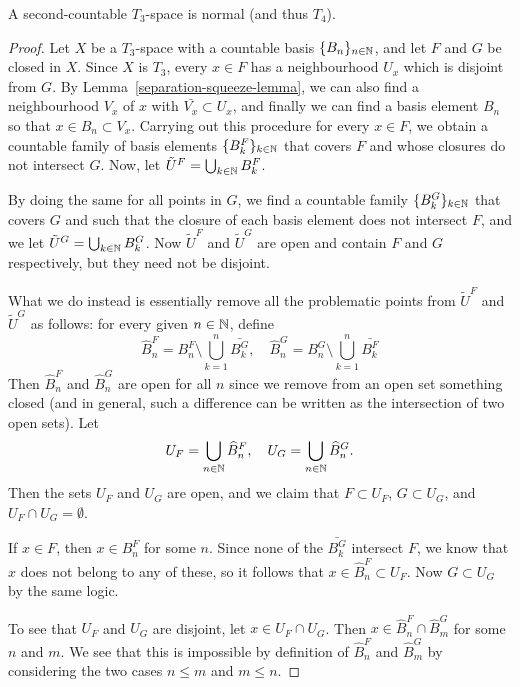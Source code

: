 \begin{thm}
  A second-countable $T_3$-space is normal (and thus $T_4$).
\end{thm}
\begin{proof}
  Let $X$ be a $T_3$-space with a countable basis $\{B_n\}_{n \in \mathbb{N}}$, and let $F$ and $G$ be closed in $X$. Since $X$ is $T_3$, every $x \in F$ has a neighbourhood $U_x$ which is disjoint from $G$. By Lemma~\ref{separation-squeeze-lemma}, we can also find a neighbourhood $V_x$ of $x$ with $\bar{V_x} \subset U_x$, and finally we can find a basis element $B_n$ so that $x \in B_n \subset V_x$. Carrying out this procedure for every $x \in F$, we obtain a countable family of basis elements $\{B^F_k\}_{k \in \mathbb{N}}$ that covers $F$ and whose closures do not intersect $G$. Now, let $\tilde{U}^F = \bigcup_{k \in \mathbb{N}} B^F_k$.
  
  By doing the same for all points in $G$, we find a countable family $\{B^G_k\}_{k \in \mathbb{N}}$ that covers $G$ and such that the closure of each basis element does not intersect $F$, and we let $\tilde{U}^G = \bigcup_{k \in \mathbb{N}} B^G_k$. Now $\tilde{U}^F$ and $\tilde{U}^G$ are open and contain $F$ and $G$ respectively, but they need not be disjoint.
  
  What we do instead is essentially remove all the problematic points from $\tilde{U}^F$ and $\tilde{U}^G$ as follows: for every given $n \in \mathbb{N}$, define
  \[
    \hat{B}^F_n = B^F_n \setminus \bigcup_{k=1}^n \bar{B^G_k}, \quad \hat{B}^G_n = B^G_n \setminus \bigcup_{k=1}^n \bar{B^F_k}
  \]
  Then $\hat{B}^F_n$ and $\hat{B}^G_n$ are open for all $n$ since we remove from an open set something closed (and in general, such a difference can be written as the intersection of two open sets). Let
  \[
    U_F = \bigcup_{n \in \mathbb{N}} \widehat{B}^F_n, \quad U_G = \bigcup_{n \in \mathbb{N}} \widehat{B}^G_n.
  \]
  Then the sets $U_F$ and $U_G$ are open, and we claim that $F \subset U_F$, $G \subset U_G$, and $U_F \cap U_G = \emptyset$.
  
  If $x \in F$, then $x \in B^F_n$ for some $n$. Since none of the $\bar{B^G_k}$ intersect $F$, we know that $x$ does not belong to any of these, so it follows that $x \in \hat{B}^F_n \subset U_F$. Now $G \subset U_G$ by the same logic.
  
  To see that $U_F$ and $U_G$ are disjoint, let $x \in U_F \cap U_G$. Then $x \in \hat{B}^F_n \cap \hat{B}^G_m$ for some $n$ and $m$. We see that this is impossible by definition of $\hat{B}^F_n$ and $\hat{B}^G_m$ by considering the two cases $n \leq m$ and $m \leq n$.
\end{proof}


